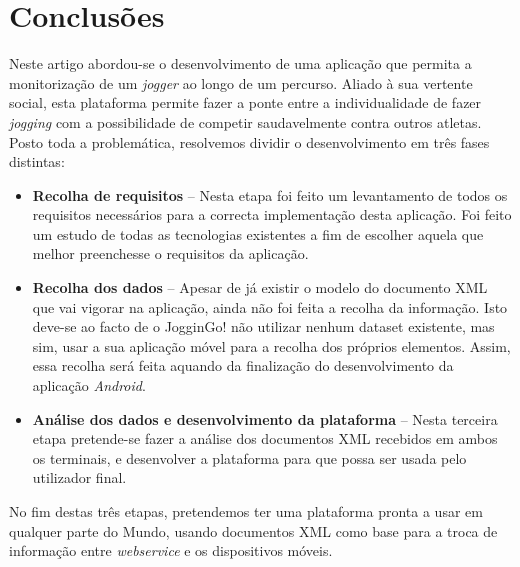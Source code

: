 \documentclass[twocolumn,twoside,10pt,a4paper]{article}
\begin{document}
\section{Conclusões}\label{sec:conclusions}

Neste artigo abordou-se o desenvolvimento de uma aplicação que permita a monitorização de um \textit{jogger} ao longo de um percurso. Aliado à sua vertente social, esta plataforma permite fazer a ponte entre a individualidade de fazer \textit{jogging} com a possibilidade de competir saudavelmente contra outros atletas.
Posto toda a problemática, resolvemos dividir o desenvolvimento em três fases distintas:

\begin{itemize}
\item \textbf{Recolha de requisitos} -- Nesta etapa foi feito um levantamento de todos os requisitos necessários para a correcta implementação desta aplicação. Foi feito um estudo de todas as tecnologias existentes a fim de escolher aquela que melhor preenchesse o requisitos da aplicação.
\item \textbf{Recolha dos dados} -- Apesar de já existir o modelo do documento XML que vai vigorar na aplicação, ainda não foi feita a recolha da informação. Isto deve-se ao facto de o JogginGo! não utilizar nenhum dataset existente, mas sim, usar a sua aplicação móvel para a recolha dos próprios elementos. Assim, essa recolha será feita aquando da finalização do desenvolvimento  da aplicação \textit{Android}.
\item \textbf{Análise dos dados e desenvolvimento da plataforma}  -- Nesta terceira etapa pretende-se fazer a análise dos documentos XML recebidos em ambos os terminais, e desenvolver a plataforma para que possa ser usada pelo utilizador final.
\end{itemize}

No fim destas três etapas, pretendemos ter uma plataforma pronta a usar em qualquer parte do Mundo, usando documentos XML como base para a troca de informação entre 	\textit{webservice} e os dispositivos móveis.


\nocite{*}
\renewcommand{\bibname}{Referências}
%
%

%
{}
\end{document}
